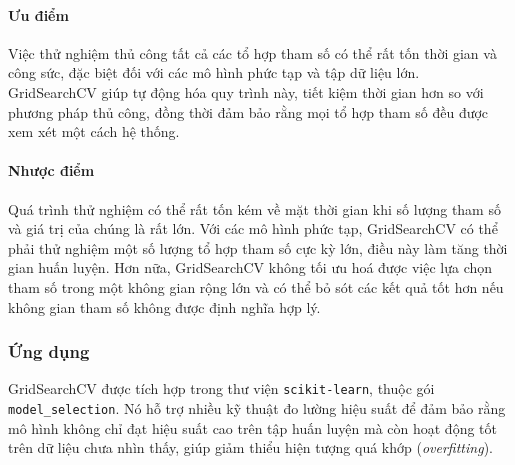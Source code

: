 \documentclass[a4paper,12pt]{article}
\begin{document}
\paragraph{Ưu điểm}
\hspace{5mm}Việc thử nghiệm thủ công tất cả các tổ hợp tham số có thể rất tốn thời gian và công sức, đặc biệt đối với các mô hình phức tạp và tập dữ liệu lớn. GridSearchCV giúp tự động hóa quy trình này, tiết kiệm thời gian hơn so với phương pháp thủ công, đồng thời đảm bảo rằng mọi tổ hợp tham số đều được xem xét một cách hệ thống.

\paragraph{Nhược điểm}
\hspace{5mm}Quá trình thử nghiệm có thể rất tốn kém về mặt thời gian khi số lượng tham số và giá trị của chúng là rất lớn. Với các mô hình phức tạp, GridSearchCV có thể phải thử nghiệm một số lượng tổ hợp tham số cực kỳ lớn, điều này làm tăng thời gian huấn luyện. Hơn nữa, GridSearchCV không tối ưu hoá được việc lựa chọn tham số trong một không gian rộng lớn và có thể bỏ sót các kết quả tốt hơn nếu không gian tham số không được định nghĩa hợp lý.

\subsubsection{Ứng dụng} 
\hspace{5mm}GridSearchCV được tích hợp trong thư viện \texttt{scikit-learn}, thuộc gói \newline \texttt{model\_selection}. Nó hỗ trợ nhiều kỹ thuật đo lường hiệu suất để đảm bảo rằng mô hình không chỉ đạt hiệu suất cao trên tập huấn luyện mà còn hoạt động tốt trên dữ liệu chưa nhìn thấy, giúp giảm thiểu hiện tượng quá khớp (\textit{overfitting}).\\
\end{document}
